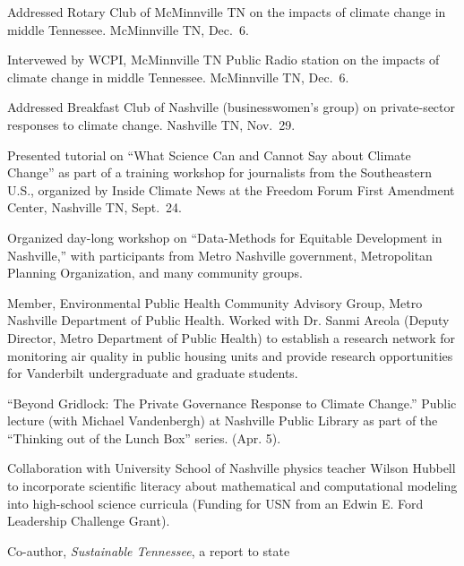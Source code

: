 \item[2018] Addressed Rotary Club of McMinnville TN on the impacts of climate
  change in middle Tennessee. McMinnville TN, Dec.\ 6.
\item[2018] Intervewed by WCPI, McMinnville TN Public Radio station on the
  impacts of climate change in middle Tennessee. McMinnville TN, Dec.\ 6.
\item[2018] Addressed Breakfast Club of Nashville (businesswomen's group) on
  private-sector responses to climate change. Nashville TN, Nov.\ 29.
\item[2018] Presented tutorial on ``What Science Can and Cannot Say about
  Climate Change'' as part of a training workshop for journalists from the
  Southeastern U.S., organized by Inside Climate News at the Freedom Forum
  First Amendment Center, Nashville TN, Sept.~24.
\item[2018] Organized day-long workshop on ``Data-Methods for Equitable
  Development in Nashville,'' with participants from Metro Nashville
  government, Metropolitan Planning Organization,
  and many community groups.
\item[2017--2019] Member, Environmental Public Health Community Advisory
  Group, Metro Nashville Department of Public Health. Worked with Dr. Sanmi
  Areola (Deputy Director, Metro Department of Public Health)
  to establish a research network for monitoring air quality in public housing
  units and provide research opportunities for Vanderbilt undergraduate and
  graduate students.
\item[2017] ``Beyond Gridlock: The Private Governance Response to Climate
  Change.'' Public lecture (with Michael Vandenbergh) at Nashville Public
  Library as part of the ``Thinking out of the Lunch Box'' series. (Apr. 5).
\item[2015--2017] Collaboration with University School of Nashville physics
  teacher Wilson Hubbell to incorporate scientific literacy about mathematical
  and computational modeling into high-school science curricula (Funding for
  USN from an Edwin E. Ford Leadership Challenge Grant).
\item[2011--2012] Co-author, \emph{Sustainable Tennessee}, a report to state
